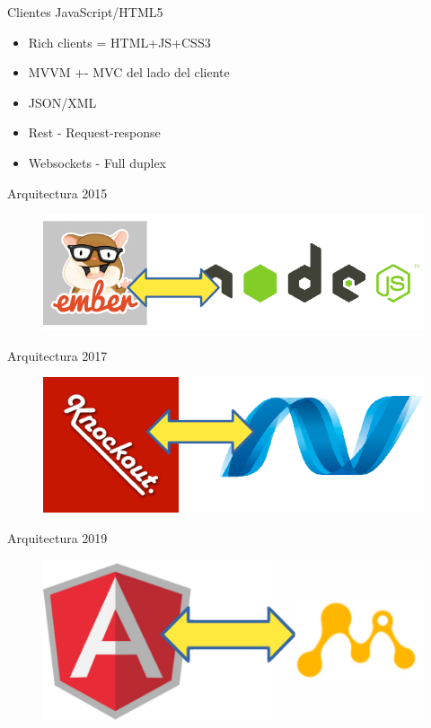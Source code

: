 \documentclass[aspectratio=169]{beamer}
\begin{document}
\begin{frame}{Clientes JavaScript/HTML5}
\begin{itemize}
	\item Rich clients = HTML+JS+CSS3
	\item MVVM +- MVC del lado del cliente
	\item JSON/XML
	\item Rest - Request-response
	\item Websockets - Full duplex
\end{itemize}
\end{frame}


\begin{frame}{Arquitectura 2015}
\begin{figure}
	\centering
	\includegraphics[width=0.8\linewidth]{Images/embernode.png}
\end{figure}
\end{frame}

\begin{frame}{Arquitectura 2017}
\begin{figure}
\centering
\includegraphics[width=0.8\linewidth]{Images/knockoutnet.png}
\end{figure}
\end{frame}

\begin{frame}{Arquitectura 2019}
\begin{figure}
\centering
\includegraphics[width=0.8\linewidth]{Images/anguaree.png}
\end{figure}
\end{frame}
\end{document}
